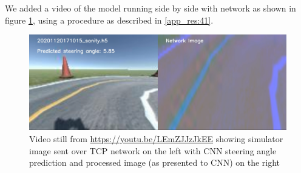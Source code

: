 We added a video of the model running side by side with network as shown in figure 
\ref{fig:20201120171015_sanity_sim_network}, using a procedure as described in \ref{app_res:41}.

\begin{figure}[ht]
 \centering 
 \includegraphics[width=\textwidth]{Figures/20201120171015_sanity_sim_network.png}
 \caption{Video still from \href{https://youtu.be/LEmZJJzJkEE}{https://youtu.be/LEmZJJzJkEE} showing simulator image sent over TCP network on the left with CNN steering angle prediction and processed image (as presented to CNN) on the right}
 \label{fig:20201120171015_sanity_sim_network} 
\end{figure}

